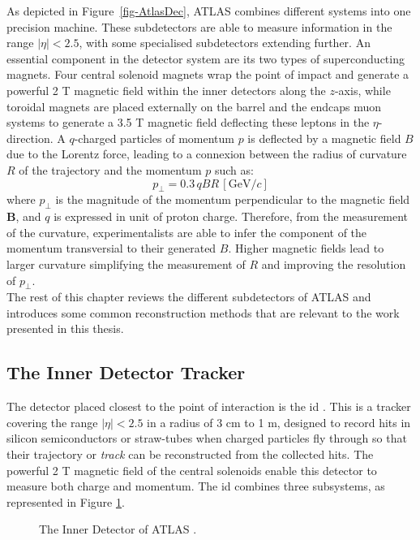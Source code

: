 As depicted in Figure~\ref{fig-AtlasDec}, ATLAS combines different systems into one precision machine. These subdetectors are able to measure information in the range $|\eta|<  2.5$, with some specialised subdetectors extending further. An essential component in the detector system are its two types of superconducting magnets. Four central solenoid magnets wrap the point of impact and generate a powerful 2 T magnetic field within the inner detectors along the $z$-axis, while toroidal magnets are placed externally on the barrel and the endcaps muon systems to generate a 3.5 T magnetic field deflecting these leptons in the $\eta$-direction. A $q$-charged particles of momentum $p$ is deflected by a magnetic field $B$ due to the Lorentz force, leading to a connexion between the radius of curvature $R$ of the trajectory and the momentum $p$ such as: 
\begin{equation}
  p_{\perp} = 0.3 \, qBR \, [\text{GeV}/c]
\end{equation}
where $p_{\perp}$ is the magnitude of the momentum perpendicular to the magnetic field $\boldsymbol{B}$, and $q$ is expressed in unit of proton charge. Therefore, from the measurement of the curvature, experimentalists are able to infer the component of the momentum transversial to their generated $B$. Higher magnetic fields lead to larger curvature simplifying the measurement of $R$ and improving the resolution of $p_{\perp}$. \\ 

The rest of this chapter reviews the different subdetectors of ATLAS and introduces some common reconstruction methods that are relevant to the work presented in this thesis. 

\subsection{The Inner Detector Tracker}
The detector placed closest to the point of interaction is the \gls{id} \cite{CERN-LHCC-97-016}. This is a tracker covering the range $|\eta| < 2.5$ in a radius of 3 cm to 1 m, designed to record hits in silicon semiconductors or straw-tubes when charged particles fly through so that their trajectory or \textit{track} can be reconstructed from the collected hits. The powerful 2 T magnetic field of the central solenoids enable this detector to measure both charge and momentum. The \gls{id} combines three subsystems, as represented in Figure \ref{fig-AtlasDecID}. 

\begin{figure}[!h]
  \centering
  \hspace{-1.25cm}
  \caption{The Inner Detector of ATLAS \cite{ATLASschematics}.}
  \label{fig-AtlasDecID}
\end{figure}

